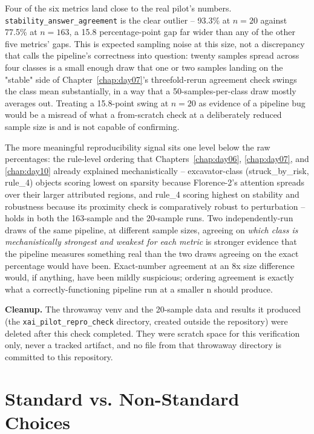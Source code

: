 Four of the six metrics land close to the real pilot's numbers. \texttt{stability\_answer\_agreement}
is the clear outlier -- 93.3\% at $n=20$ against 77.5\% at $n=163$, a 15.8 percentage-point gap far
wider than any of the other five metrics' gaps. This is expected sampling noise at this size, not a
discrepancy that calls the pipeline's correctness into question: twenty samples spread across four
classes is a small enough draw that one or two samples landing on the "stable" side of
Chapter~\ref{chap:day07}'s threefold-rerun agreement check swings the class mean substantially, in a
way that a 50-samples-per-class draw mostly averages out. Treating a 15.8-point swing at $n=20$ as
evidence of a pipeline bug would be a misread of what a from-scratch check at a deliberately reduced
sample size is and is not capable of confirming.

The more meaningful reproducibility signal sits one level below the raw percentages: the rule-level
ordering that Chapters~\ref{chap:day06}, \ref{chap:day07}, and \ref{chap:day10} already explained
mechanistically -- excavator-class (struck\_by\_risk, rule\_4) objects scoring lowest on sparsity
because Florence-2's attention spreads over their larger attributed regions, and rule\_4 scoring
highest on stability and robustness because its proximity check is comparatively robust to
perturbation -- holds in both the 163-sample and the 20-sample runs. Two independently-run draws of
the same pipeline, at different sample sizes, agreeing on \emph{which class is mechanistically
strongest and weakest for each metric} is stronger evidence that the pipeline measures something
real than the two draws agreeing on the exact percentage would have been. Exact-number agreement at
an 8x size difference would, if anything, have been mildly suspicious; ordering agreement is exactly
what a correctly-functioning pipeline run at a smaller n should produce.

\textbf{Cleanup.} The throwaway venv and the 20-sample data and results it produced (the
\texttt{xai\_pilot\_repro\_check} directory, created outside the repository) were deleted after
this check completed. They were scratch space for this verification only, never a tracked
artifact, and no file from that throwaway directory is committed to this repository.

\section{Standard vs. Non-Standard Choices}

